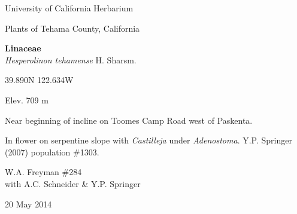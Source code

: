 \documentclass[letterpaper,10pt]{article}
\begin{document}
\begin{minipage}[t]{0.40\textwidth}

\begin{center}
University of California Herbarium \\
\begin{large}
Plants of Tehama County, California \\
\end{large}
\vspace{\baselineskip}
\textbf{Linaceae} \\
\textit{Hesperolinon tehamense} H. Sharsm.\\
\end{center}

\begin{footnotesize}

\begin{multicols}{2}
39.890\textdegree N 122.634\textdegree W
\columnbreak
\begin{flushright}
Elev. 709 m
\end{flushright}
\end{multicols}

Near beginning of incline on Toomes Camp Road west of Paskenta.
\vspace{\baselineskip}

In flower on serpentine slope with \textit{Castilleja} under \textit{Adenostoma}. Y.P. Springer (2007) population \#1303.

\begin{multicols}{2}
W.A. Freyman \#284 \\
with A.C. Schneider \& Y.P. Springer
\columnbreak
\begin{flushright}
20 May 2014
\end{flushright}
\end{multicols}

\end{footnotesize}

\end{minipage}
%
\hspace{2cm}
%
\end{document}

